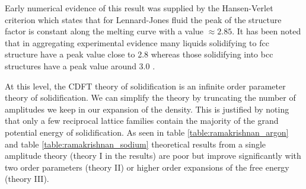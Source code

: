Early numerical evidence of this result was supplied by the Hansen-Verlet
criterion \cite{HANSEN69} which states that for Lennard-Jones fluid the peak
of the structure factor is constant along the melting curve with a value 
$\approx 2.85$. It has been noted that in aggregating experimental evidence
many liquids solidifying to fcc structure have a peak value close to 2.8 
whereas those solidifying into bcc structures have a peak value around 3.0
\cite{RAMAKRISHNAN79}.

At this level, the CDFT theory of solidification is an infinite order
parameter theory of solidification. We can simplify the theory by truncating
the number of amplitudes we keep in our expansion of the density. This is
justified by noting that only a few reciprocal lattice families contain the
majority of the grand potential energy of solidification. As seen in table
\ref{table:ramakrishnan_argon} and table \ref{table:ramakrishnan_sodium}
theoretical results from a single amplitude theory (theory I in the results)
are poor but improve significantly with two order parameters (theory II) or
higher order expansions of the free energy (theory III).

